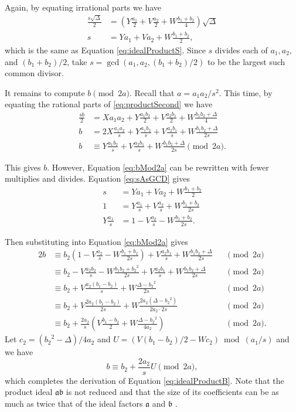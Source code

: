 \documentclass{ucalgthes1}
\theoremstyle{definition}
\begin{document}
\noindent
Again, by equating irrational parts we have
\begin{align}
	\frac{s\sqrt\Delta}{2} & = \left(Y\frac{a_1}{2} + V\frac{a_2}{2} + W\frac{b_1+b_2}{4}\right)\sqrt\Delta \nonumber \\
	s & = Ya_1 + Va_2 + W\frac{b_1+b_2}{2}, \label{eq:sAsGCD}
\end{align}
which is the same as Equation \ref{eq:idealProductS}.  Since $s$ divides each of $a_1, a_2,$ and $(b_1+b_2)/2$, take $s = \gcd(a_1, a_2, (b_1+b_2)/2)$ to be the largest such common divisor.

It remains to compute $b \pmod{2a}$.  Recall that $a = a_1a_2/s^2$.  This time, by equating the rational parts of \eqref{eq:productSecond} we have
\begin{align}
	\frac{sb}{2} & = Xa_1a_2 + Y\frac{a_1b_2}{2} + V\frac{a_2b_1}{2} + W\frac{b_1b_2 + \Delta}{4} \nonumber \\
	b & = 2X\frac{a_1a_2}{s} + Y\frac{a_1b_2}{s} + V\frac{a_2b_1}{s} + W\frac{b_1b_2 + \Delta}{2s} \nonumber \\
	b & \equiv Y\frac{a_1b_2}{s} + V\frac{a_2b_1}{s} + W\frac{b_1b_2 + \Delta}{2s} \pmod{2a}. \label{eq:bMod2a}
\end{align}

\noindent
This gives $b$.  However, Equation \eqref{eq:bMod2a} can be rewritten with fewer multiplies and divides.  Equation \eqref{eq:sAsGCD} gives
\begin{align*}
	s & = Ya_1 + Va_2 + W\frac{b_1+b_2}{2} \\
	1 & = Y\frac{a_1}{s} + V\frac{a_2}{s} + W\frac{b_1+b_2}{2s} \\
	Y\frac{a_1}{s} & = 1 - V\frac{a_2}{s} - W\frac{b_1+b_2}{2s}.
\end{align*}

\noindent
Then substituting into Equation \eqref{eq:bMod2a} gives
\begin{alignat*}{2}
	b & \equiv b_2(1-V\frac{a_2}{s} - W\frac{b_1+b_2}{2s}) + V\frac{a_2b_1}{s} + W\frac{b_1b_2 + \Delta}{2s} && \pmod{2a} \\
	& \equiv b_2 - V\frac{a_2b_2}{s} - W\frac{b_1b_2+{b_2}^2}{2s} + V\frac{a_2b_1}{s} + W\frac{b_1b_2 + \Delta}{2s} && \pmod{2a} \\
	& \equiv b_2 + V\frac{a_2(b_1-b_2)}{s} + W\frac{\Delta - {b_2}^2}{2s} && \pmod{2a} \\
	& \equiv b_2 + V\frac{2a_2(b_1-b_2)}{2s} + W\frac{2a_2(\Delta - {b_2}^2)}{2a_2 \cdot 2s} && \pmod{2a} \\
	& \equiv b_2 + \frac{2a_2}{s} \left( V\frac{b_1-b_2}{2} + W\frac{\Delta - {b_2}^2}{4a_2} \right) && \pmod{2a}.
\end{alignat*}
Let $c_2 = ({b_2}^2 - \Delta)/4a_2$ and $U = (V(b_1-b_2)/2 - Wc_2) \bmod{(a_1/s)}$ and we have
\[
	b \equiv b_2 + \frac{2a_2}{s} U \pmod{2a},
\]
which completes the derivation of Equation \ref{eq:idealProductB}.  Note that the product ideal $\mathfrak a \mathfrak b$ is not reduced and that the size of its coefficients can be as much as twice that of the ideal factors $\mathfrak a$ and $\mathfrak b$ \cite[p.118]{Jacobson2009}.
\end{document}
